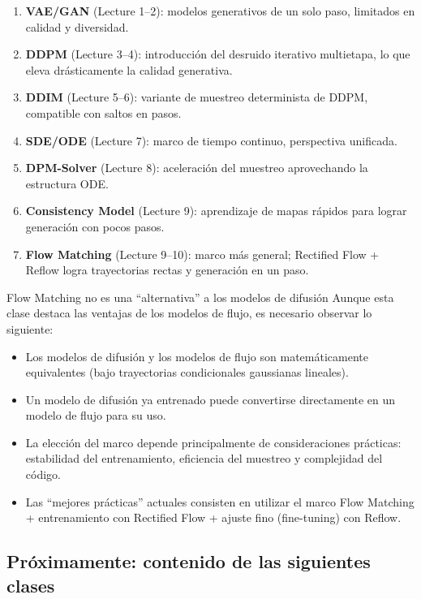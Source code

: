 \documentclass[a4paper]{article}
\begin{document}
\begin{enumerate}
    \item \textbf{VAE/GAN} (Lecture 1--2): modelos generativos de un solo paso, limitados en calidad y diversidad.
    \item \textbf{DDPM} (Lecture 3--4): introducción del desruido iterativo multietapa, lo que eleva drásticamente la calidad generativa.
    \item \textbf{DDIM} (Lecture 5--6): variante de muestreo determinista de DDPM, compatible con saltos en pasos.
    \item \textbf{SDE/ODE} (Lecture 7): marco de tiempo continuo, perspectiva unificada.
    \item \textbf{DPM-Solver} (Lecture 8): aceleración del muestreo aprovechando la estructura ODE.
    \item \textbf{Consistency Model} (Lecture 9): aprendizaje de mapas rápidos para lograr generación con pocos pasos.
    \item \textbf{Flow Matching} (Lecture 9--10): marco más general; Rectified Flow + Reflow logra trayectorias rectas y generación en un paso.
\end{enumerate}

\begin{warningbox}{Flow Matching no es una ``alternativa'' a los modelos de difusión}
Aunque esta clase destaca las ventajas de los modelos de flujo, es necesario observar lo siguiente:
\begin{itemize}
    \item Los modelos de difusión y los modelos de flujo son matemáticamente equivalentes (bajo trayectorias condicionales gaussianas lineales).
    \item Un modelo de difusión ya entrenado puede convertirse directamente en un modelo de flujo para su uso.
    \item La elección del marco depende principalmente de consideraciones prácticas: estabilidad del entrenamiento, eficiencia del muestreo y complejidad del código.
    \item Las ``mejores prácticas'' actuales consisten en utilizar el marco Flow Matching + entrenamiento con Rectified Flow + ajuste fino (fine-tuning) con Reflow.
\end{itemize}
\end{warningbox}

\subsection{Próximamente: contenido de las siguientes clases}
\end{document}
